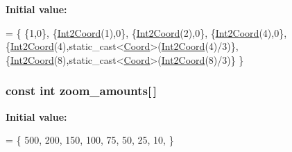 {\bfseries Initial value\-:}
\begin{DoxyCode}
=
\{
    \{1,0\},
    \{\hyperlink{a00204_a1bc12e8db97070dae0b6256347c8c2d6}{Int2Coord}(1),0\},
    \{\hyperlink{a00204_a1bc12e8db97070dae0b6256347c8c2d6}{Int2Coord}(2),0\},
    \{\hyperlink{a00204_a1bc12e8db97070dae0b6256347c8c2d6}{Int2Coord}(4),0\},
    \{\hyperlink{a00204_a1bc12e8db97070dae0b6256347c8c2d6}{Int2Coord}(4),\textcolor{keyword}{static\_cast<}\hyperlink{a00216_acd9dae57b712df0e2d3588c0c4798c11}{Coord}\textcolor{keyword}{>}(\hyperlink{a00204_a1bc12e8db97070dae0b6256347c8c2d6}{Int2Coord}(4)/3)\},
    \{\hyperlink{a00204_a1bc12e8db97070dae0b6256347c8c2d6}{Int2Coord}(8),\textcolor{keyword}{static\_cast<}\hyperlink{a00216_acd9dae57b712df0e2d3588c0c4798c11}{Coord}\textcolor{keyword}{>}(\hyperlink{a00204_a1bc12e8db97070dae0b6256347c8c2d6}{Int2Coord}(8)/3)\}
\}
\end{DoxyCode}
\hypertarget{a00226_a78b0dfa6de03f88325ba95ae25f33320}{
\subsubsection[{zoom\-\_\-amounts}]{\setlength{\rightskip}{0pt plus 5cm}const int zoom\-\_\-amounts\mbox{[}$\,$\mbox{]}}}\label{a00226_a78b0dfa6de03f88325ba95ae25f33320}
{\bfseries Initial value\-:}
\begin{DoxyCode}
=
\{
    500, 200, 150, 100, 75, 50, 25, 10,
\}
\end{DoxyCode}
